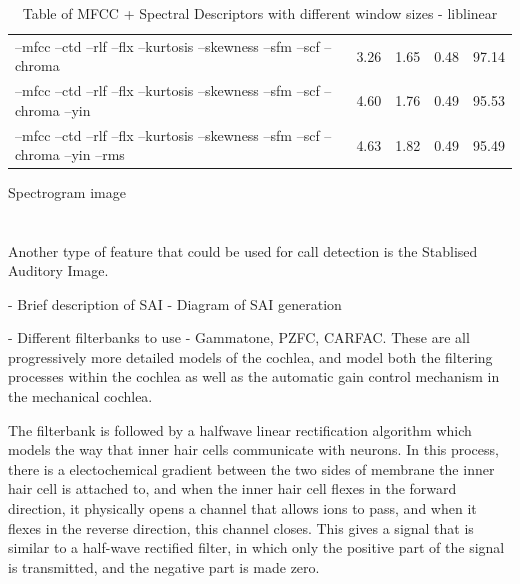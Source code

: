 \documentclass[12pt,oneside]{book}
\begin{document}
\begin{table}
\begin{tabular}{|l|l|l|l|l|}
--mfcc --ctd --rlf --flx --kurtosis --skewness --sfm --scf --chroma              & 3.26            & 1.65            & 0.48            & 97.14           \\
--mfcc --ctd --rlf --flx --kurtosis --skewness --sfm --scf --chroma --yin        & 4.60            & 1.76            & 0.49            & 95.53           \\
--mfcc --ctd --rlf --flx --kurtosis --skewness --sfm --scf --chroma --yin --rms  & 4.63            & 1.82            & 0.49            & 95.49           \\


\hline
\end{tabular}
\caption{Table of MFCC + Spectral Descriptors with different window
  sizes - liblinear}
\label{table:obv-4-differentFeatures}
\end{table}

%
%

Spectrogram image



\begin{table}
\begin{tabular}{|l|l|l|l|l|}
\hline


\hline
\end{tabular}
\caption{}
\label{table:obv-5-spectrogramImage}
\end{table}




%
%

Another type of feature that could be used for call detection is the
Stablised Auditory Image.  

- Brief description of SAI
- Diagram of SAI generation

- Different filterbanks to use - Gammatone, PZFC, CARFAC.  These are
all progressively more detailed models of the cochlea, and model both
the filtering processes within the cochlea as well as the automatic
gain control mechanism in the mechanical cochlea.

The filterbank is followed by a halfwave linear rectification
algorithm which models the way that inner hair cells communicate with
neurons.  In this process, there is a electochemical gradient between
the two sides of membrane the inner hair cell is attached to, and when
the inner hair cell flexes in the forward direction, it physically
opens a channel that allows ions to pass, and when it flexes in the
reverse direction, this channel closes.  This gives a signal that is
similar to a half-wave rectified filter, in which only the positive
part of the signal is transmitted, and the negative part is made zero.
\end{document}
